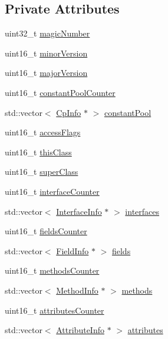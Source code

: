 \subsection*{Private Attributes}
\begin{DoxyCompactItemize}
\item 
uint32\+\_\+t \hyperlink{class_class_loader_a7442307ca76e7d8a9be304db4e33b66d}{magic\+Number}
\item 
uint16\+\_\+t \hyperlink{class_class_loader_abdd2cd7ba1f788bc38cb337f5ae5b5a5}{minor\+Version}
\item 
uint16\+\_\+t \hyperlink{class_class_loader_a7a02cc0f6fe77ff6e5f9309ab4bc31b5}{major\+Version}
\item 
uint16\+\_\+t \hyperlink{class_class_loader_af45f7e190304e384793dda63d127503f}{constant\+Pool\+Counter}
\item 
std\+::vector$<$ \hyperlink{class_cp_info}{Cp\+Info} $\ast$ $>$ \hyperlink{class_class_loader_a5ed8e2522a4648fee01751f80be2cbd2}{constant\+Pool}
\item 
uint16\+\_\+t \hyperlink{class_class_loader_ab5d88fdb250c1d7b0e315afd32edf2d5}{access\+Flags}
\item 
uint16\+\_\+t \hyperlink{class_class_loader_ab4ec421aef6d619f8e2ae86ea08d62f2}{this\+Class}
\item 
uint16\+\_\+t \hyperlink{class_class_loader_ab15e6151a14afaa40e3f5ff63fa72106}{super\+Class}
\item 
uint16\+\_\+t \hyperlink{class_class_loader_a10b6072e3219bf2c62bde208923a8bd5}{interface\+Counter}
\item 
std\+::vector$<$ \hyperlink{class_interface_info}{Interface\+Info} $\ast$ $>$ \hyperlink{class_class_loader_ae80a739acf39382233e56bac10559a5b}{interfaces}
\item 
uint16\+\_\+t \hyperlink{class_class_loader_a6a2f6f9c57e378dd5c36f6bb61116ce3}{fields\+Counter}
\item 
std\+::vector$<$ \hyperlink{class_field_info}{Field\+Info} $\ast$ $>$ \hyperlink{class_class_loader_a4f4f63df7b9b46194c9f843de8b2cdfd}{fields}
\item 
uint16\+\_\+t \hyperlink{class_class_loader_a68f4e0b040607cea6a56960ed05ae364}{methods\+Counter}
\item 
std\+::vector$<$ \hyperlink{struct_method_info}{Method\+Info} $\ast$ $>$ \hyperlink{class_class_loader_a003398daa2f1cb3e48c6efbd1a273b17}{methods}
\item 
uint16\+\_\+t \hyperlink{class_class_loader_a0d223edb7107eaa9824fdee870944d9b}{attributes\+Counter}
\item 
std\+::vector$<$ \hyperlink{class_attribute_info}{Attribute\+Info} $\ast$ $>$ \hyperlink{class_class_loader_a1b9e4949bbf3a2bf2e0c7b830044c653}{attributes}
\end{DoxyCompactItemize}


